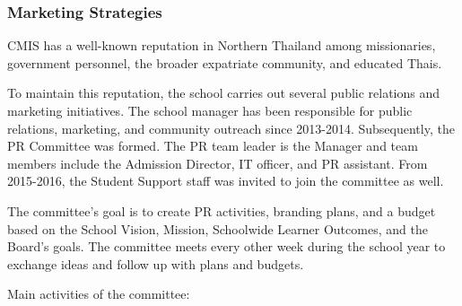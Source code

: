 \subsubsection{Marketing Strategies}



\begin{findings}
CMIS has a well-known reputation in Northern Thailand among missionaries, government personnel, the broader
expatriate community, and educated Thais.

To maintain this reputation, the school carries out several public relations and marketing initiatives. The school manager has been responsible for public relations, marketing, and community outreach since 2013-2014. Subsequently, the PR Committee was formed. The PR team leader is the Manager and team members include the Admission Director, IT officer, and PR assistant. From 2015-2016, the Student Support staff was invited to join the committee as well. 

The committee’s goal is to create PR activities, branding plans, and a budget based on the School Vision, Mission, Schoolwide Learner Outcomes, and the Board’s goals. The committee meets every other week during the school year to exchange ideas and follow up with plans and budgets.

Main activities of the committee:


\end{findings}
